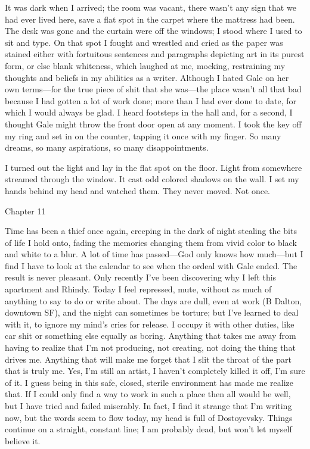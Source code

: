It was dark when I arrived; the room was vacant, there wasn't any sign
that we had ever lived here, save a flat spot in the carpet where the
mattress had been. The desk was gone and the curtain were off the
windows; I stood where I used to sit and type. On that spot I fought and
wrestled and cried as the paper was stained either with fortuitous
sentences and paragraphs depicting art in its purest form, or else blank
whiteness, which laughed at me, mocking, restraining my thoughts and
beliefs in my abilities as a writer. Although I hated Gale on her own
terms---for the true piece of shit that she was---the place wasn't all
that bad because I had gotten a lot of work done; more than I had ever
done to date, for which I would always be glad. I heard footsteps in the
hall and, for a second, I thought Gale might throw the front door open
at any moment. I took the key off my ring and set in on the counter,
tapping it once with my finger. So many dreams, so many aspirations, so
many disappointments.

I turned out the light and lay in the flat spot on the floor. Light from
somewhere streamed through the window. It cast odd colored shadows on
the wall. I set my hands behind my head and watched them. They never
moved. Not once.

Chapter 11

Time has been a thief once again, creeping in the dark of night stealing
the bits of life I hold onto, fading the memories changing them from
vivid color to black and white to a blur. A lot of time has passed---God
only knows how much---but I find I have to look at the calendar to see
when the ordeal with Gale ended. The result is never pleasant. Only
recently I've been discovering why I left this apartment and Rhindy.
Today I feel repressed, mute, without as much of anything to say to do
or write about. The days are dull, even at work (B Dalton, downtown SF),
and the night can sometimes be torture; but I've learned to deal with
it, to ignore my mind's cries for release. I occupy it with other
duties, like car shit or something else equally as boring. Anything that
takes me away from having to realize that I'm not producing, not
creating, not doing the thing that drives me. Anything that will make me
forget that I slit the throat of the part that is truly me. Yes, I'm
still an artist, I haven't completely killed it off, I'm sure of it. I
guess being in this safe, closed, sterile environment has made me
realize that. If I could only find a way to work in such a place then
all would be well, but I have tried and failed miserably. In fact, I
find it strange that I'm writing now, but the words seem to flow today,
my head is full of Dostoyevsky. Things continue on a straight, constant
line; I am probably dead, but won't let myself believe it.

